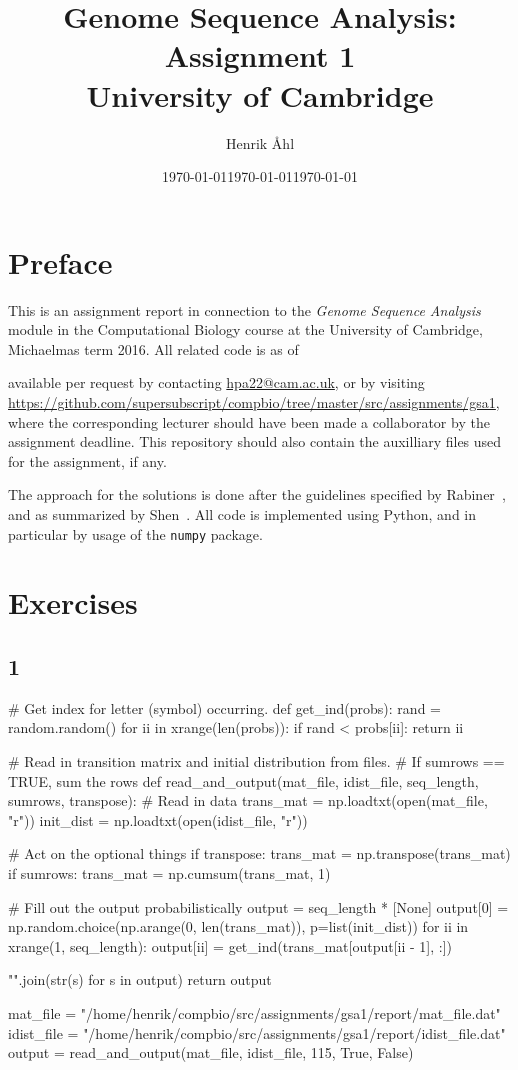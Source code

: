 \documentclass[10pt]{article}\usepackage[]{graphicx}\usepackage[]{color}
\title
{
\textbf
{
Genome Sequence Analysis: Assignment 1}\\[1em]
\small{University of Cambridge}
}
\author{Henrik Åhl}
\date{\today}
\theoremstyle{plain}
\begin{document}
\date{\today}
\maketitle
\setcounter{page}{1}
\section*{Preface}
This is an assignment report in connection to the \textit{Genome Sequence Analysis} module in the Computational Biology course at the University of Cambridge, Michaelmas term 2016. All related code is as of \date{\today} available per request by contacting \href{mailto:hpa22@cam.ac.uk}{hpa22@cam.ac.uk}, or by visiting \url{https://github.com/supersubscript/compbio/tree/master/src/assignments/gsa1}, where the corresponding lecturer should have been made a collaborator by the assignment deadline. This repository should also contain the auxilliary files used for the assignment, if any.

The approach for the solutions is done after the guidelines specified by Rabiner~\cite{rabiner}, and as summarized by Shen~\cite{shen}. All code is implemented using Python, and in particular by usage of the \texttt{numpy} package. 

\section*{Exercises}
\subsection*{1}
\begin{Schunk}
\begin{Sinput}
# Get index for letter (symbol) occurring.
def get_ind(probs):
    rand = random.random()
    for ii in xrange(len(probs)):
        if rand < probs[ii]:
            return ii


# Read in transition matrix and initial distribution from files.
# If sumrows == TRUE, sum the rows
def read_and_output(mat_file, idist_file, seq_length, sumrows, transpose):
    # Read in data
    trans_mat = np.loadtxt(open(mat_file, "r"))
    init_dist = np.loadtxt(open(idist_file, "r"))

    # Act on the optional things
    if transpose:
        trans_mat = np.transpose(trans_mat)
    if sumrows:
        trans_mat = np.cumsum(trans_mat, 1)

    # Fill out the output probabilistically
    output = seq_length * [None]
    output[0] = np.random.choice(np.arange(0, len(trans_mat)), p=list(init_dist))
    for ii in xrange(1, seq_length):
        output[ii] = get_ind(trans_mat[output[ii - 1], :])

    "".join(str(s) for s in output)
    return output


mat_file = "/home/henrik/compbio/src/assignments/gsa1/report/mat_file.dat"
idist_file = "/home/henrik/compbio/src/assignments/gsa1/report/idist_file.dat"
output = read_and_output(mat_file, idist_file, 115, True, False)
\end{Sinput}
\end{Schunk}
 
\end{document}
